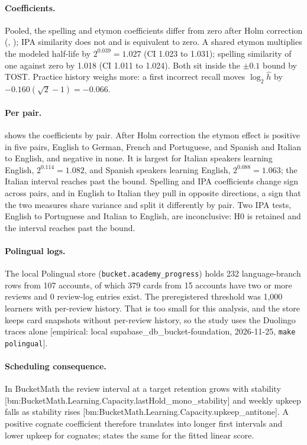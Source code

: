 \documentclass[11pt]{article}
\begin{document}
\paragraph{Coefficients.} Pooled, the spelling and etymon coefficients
differ from zero after Holm correction (,
); IPA similarity does not and is equivalent to zero. A
shared etymon multiplies the modeled half-life by $2^{0.039}=1.027$
(CI 1.023 to 1.031); spelling similarity of one against zero by 1.018
(CI 1.011 to 1.024). Both sit inside the $\pm0.1$ bound by TOST. Practice
history weighs more: a first incorrect recall moves $\log_2 \hat h$ by
$-0.160(\sqrt2-1) = -0.066$.

\paragraph{Per pair.}  shows the coefficients by pair.
After Holm correction the etymon effect is positive in five pairs,
English to German, French and Portuguese, and Spanish and Italian to
English, and negative in none. It is largest for Italian speakers
learning English, $2^{0.114}=1.082$, and Spanish speakers learning
English, $2^{0.088}=1.063$; the Italian interval reaches past the bound.
Spelling and IPA coefficients change sign across pairs, and in English
to Italian they pull in opposite directions, a sign that the two
measures share variance and split it differently by pair. Two IPA tests,
English to Portuguese and Italian to English, are inconclusive: H0 is
retained and the interval reaches past the bound.

\paragraph{Polingual logs.} The local Polingual store
(\texttt{bucket.academy\_progress}) holds 232 language-branch rows from 107 accounts, of which 379 cards
from 15 accounts have two or more reviews and 0 review-log entries exist.
The preregistered threshold was 1,000 learners with per-review history.
That is too small for this analysis, and the store keeps card snapshots
without per-review history, so the study uses the Duolingo traces alone
[empirical: local supabase\_db\_bucket-foundation, 2026-11-25,
\texttt{make polingual}].

\paragraph{Scheduling consequence.} In BucketMath the review interval at
a target retention grows with stability
[bm:BucketMath.Learning.Capacity.lastHold\_mono\_stability] and weekly
upkeep falls as stability rises
[bm:BucketMath.Learning.Capacity.upkeep\_antitone]. A positive cognate
coefficient therefore translates into longer first intervals and lower
upkeep for cognates;  states the same for the fitted
linear score.
\end{document}
